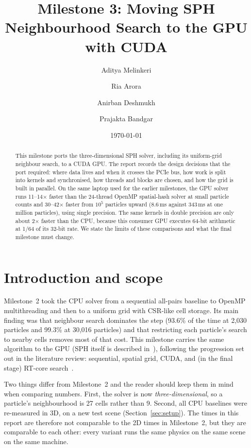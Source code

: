 \documentclass[11pt]{article}
\title{Milestone 3: Moving SPH Neighbourhood Search to the GPU with CUDA}
\author{Aditya Melinkeri \and Ria Arora \and Anirban Deshmukh \and Prajakta Bandgar}
\date{\today}
\begin{document}
\maketitle

\begin{abstract}
This milestone ports the three-dimensional SPH solver, including its uniform-grid neighbour search, to a CUDA GPU. The report records the design decisions that the port required: where data lives and when it crosses the PCIe bus, how work is split into kernels and synchronised, how threads and blocks are chosen, and how the grid is built in parallel. On the same laptop used for the earlier milestones, the GPU solver runs 11--14$\times$ faster than the 24-thread OpenMP spatial-hash solver at small particle counts and 30--42$\times$ faster from $10^5$ particles upward (8.6\,ms against 343\,ms at one million particles), using single precision. The same kernels in double precision are only about 2$\times$ faster than the CPU, because this consumer GPU executes 64-bit arithmetic at 1/64 of its 32-bit rate. We state the limits of these comparisons and what the final milestone must change.
\end{abstract}

\section{Introduction and scope}

Milestone~2 took the CPU solver from a sequential all-pairs baseline to OpenMP multithreading and then to a uniform grid with CSR-like cell storage. Its main finding was that neighbour search dominates the step (93.6\% of the time at 2,030 particles and 99.3\% at 30,016 particles) and that restricting each particle's search to nearby cells removes most of that cost. This milestone carries the same algorithm to the GPU (SPH itself is described in~\cite{mueller2003}), following the progression set out in the literature review: sequential, spatial grid, CUDA, and (in the final stage) RT-core search~\cite{green2010,zhu2022}.

Two things differ from Milestone~2 and the reader should keep them in mind when comparing numbers. First, the solver is now \emph{three-dimensional}, so a particle's neighbourhood is 27 cells rather than 9. Second, all CPU baselines were re-measured in 3D, on a new test scene (Section~\ref{sec:setup}). The times in this report are therefore not comparable to the 2D times in Milestone~2, but they are comparable to each other: every variant runs the same physics on the same scene on the same machine.
\end{document}
